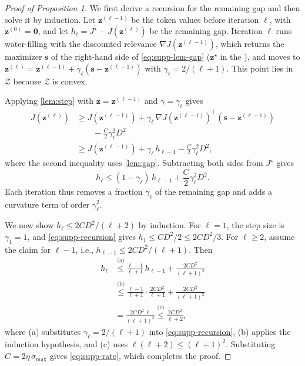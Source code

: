 \begin{proof}[Proof of Proposition 1]
We first derive a recursion for the remaining gap and then solve it by induction. Let $\mathbf z^{(\ell-1)}$ be the token values before iteration $\ell$, with $\mathbf z^{(0)}=\mathbf 0$, and let $h_\ell=J^\star-J(\mathbf z^{(\ell)})$ be the remaining gap. Iteration $\ell$ runs water-filling with the discounted relevance $\nabla J(\mathbf z^{(\ell-1)})$, which returns the maximizer $\mathbf s$ of the right-hand side of \cref{eq:supp-lem-gap} ($\mathbf z^\star$ in the \mainpaper), and moves to $\mathbf z^{(\ell)}=\mathbf z^{(\ell-1)}+\gamma_\ell(\mathbf s-\mathbf z^{(\ell-1)})$ with $\gamma_\ell=2/(\ell+1)$. This point lies in $\mathcal Z$ because $\mathcal Z$ is convex.

Applying \cref{lem:step} with $\mathbf z=\mathbf z^{(\ell-1)}$ and $\gamma=\gamma_\ell$ gives
\begin{align*}
  J(\mathbf z^{(\ell)})
  &\ge J(\mathbf z^{(\ell-1)})+\gamma_\ell\,\nabla J(\mathbf z^{(\ell-1)})^{\top}(\mathbf s-\mathbf z^{(\ell-1)})\\
  &\qquad-\frac{C}{2}\gamma_\ell^2D^2\\
  &\ge J(\mathbf z^{(\ell-1)})+\gamma_\ell\,h_{\ell-1}-\frac{C}{2}\gamma_\ell^2D^2 ,
\end{align*}
where the second inequality uses \cref{lem:gap}. Subtracting both sides from $J^\star$ gives
\begin{equation}
  h_\ell\le(1-\gamma_\ell)\,h_{\ell-1}+\frac{C}{2}\gamma_\ell^2D^2 .
\label{eq:supp-recursion}
\end{equation}
Each iteration thus removes a fraction $\gamma_\ell$ of the remaining gap and adds a curvature term of order $\gamma_\ell^2$.

We now show $h_\ell\le2CD^2/(\ell+2)$ by induction. For $\ell=1$, the step size is $\gamma_1=1$, and \cref{eq:supp-recursion} gives $h_1\le CD^2/2\le2CD^2/3$. For $\ell\ge2$, assume the claim for $\ell-1$, i.e., $h_{\ell-1}\le2CD^2/(\ell+1)$. Then
\begin{align*}
  h_\ell&\overset{\text{(a)}}{\le}\frac{\ell-1}{\ell+1}\,h_{\ell-1}+\frac{2CD^2}{(\ell+1)^2}\\
  &\overset{\text{(b)}}{\le}\frac{\ell-1}{\ell+1}\cdot\frac{2CD^2}{\ell+1}+\frac{2CD^2}{(\ell+1)^2}\\
  &=\frac{2CD^2\,\ell}{(\ell+1)^2}\overset{\text{(c)}}{\le}\frac{2CD^2}{\ell+2} ,
\end{align*}
where (a) substitutes $\gamma_\ell=2/(\ell+1)$ into \cref{eq:supp-recursion}, (b) applies the induction hypothesis, and (c) uses $\ell(\ell+2)\le(\ell+1)^2$. Substituting $C=2\eta\,\sigma_{\max}$ gives \cref{eq:supp-rate}, which completes the proof.
\end{proof}

